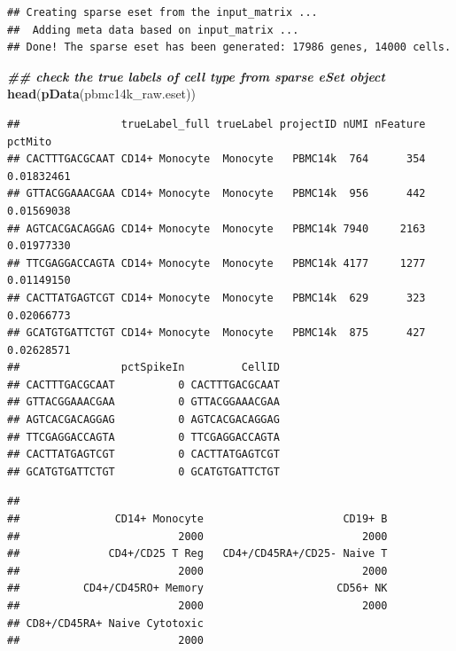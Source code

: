 \documentclass[
  12pt,
]{book}
\newenvironment{Shaded}{\begin{snugshade}}{\end{snugshade}}
\newcommand{\DocumentationTok}[1]{\textcolor[rgb]{0.56,0.35,0.01}{\textbf{\textit{#1}}}}
\newcommand{\FunctionTok}[1]{\textcolor[rgb]{0.13,0.29,0.53}{\textbf{#1}}}
\newcommand{\NormalTok}[1]{#1}
\newcommand{\SpecialCharTok}[1]{\textcolor[rgb]{0.81,0.36,0.00}{\textbf{#1}}}
\begin{document}
\begin{verbatim}
## Creating sparse eset from the input_matrix ...
##  Adding meta data based on input_matrix ...
## Done! The sparse eset has been generated: 17986 genes, 14000 cells.
\end{verbatim}

\begin{Shaded}
\begin{Highlighting}[]
\DocumentationTok{\#\# check the true labels of cell type from sparse eSet object}
\FunctionTok{head}\NormalTok{(}\FunctionTok{pData}\NormalTok{(pbmc14k\_raw.eset))}
\end{Highlighting}
\end{Shaded}

\begin{verbatim}
##                trueLabel_full trueLabel projectID nUMI nFeature    pctMito
## CACTTTGACGCAAT CD14+ Monocyte  Monocyte   PBMC14k  764      354 0.01832461
## GTTACGGAAACGAA CD14+ Monocyte  Monocyte   PBMC14k  956      442 0.01569038
## AGTCACGACAGGAG CD14+ Monocyte  Monocyte   PBMC14k 7940     2163 0.01977330
## TTCGAGGACCAGTA CD14+ Monocyte  Monocyte   PBMC14k 4177     1277 0.01149150
## CACTTATGAGTCGT CD14+ Monocyte  Monocyte   PBMC14k  629      323 0.02066773
## GCATGTGATTCTGT CD14+ Monocyte  Monocyte   PBMC14k  875      427 0.02628571
##                pctSpikeIn         CellID
## CACTTTGACGCAAT          0 CACTTTGACGCAAT
## GTTACGGAAACGAA          0 GTTACGGAAACGAA
## AGTCACGACAGGAG          0 AGTCACGACAGGAG
## TTCGAGGACCAGTA          0 TTCGAGGACCAGTA
## CACTTATGAGTCGT          0 CACTTATGAGTCGT
## GCATGTGATTCTGT          0 GCATGTGATTCTGT
\end{verbatim}

\begin{Shaded}
\end{Shaded}

\begin{verbatim}
## 
##               CD14+ Monocyte                      CD19+ B 
##                         2000                         2000 
##              CD4+/CD25 T Reg   CD4+/CD45RA+/CD25- Naive T 
##                         2000                         2000 
##          CD4+/CD45RO+ Memory                     CD56+ NK 
##                         2000                         2000 
## CD8+/CD45RA+ Naive Cytotoxic 
##                         2000
\end{verbatim}
\end{document}
